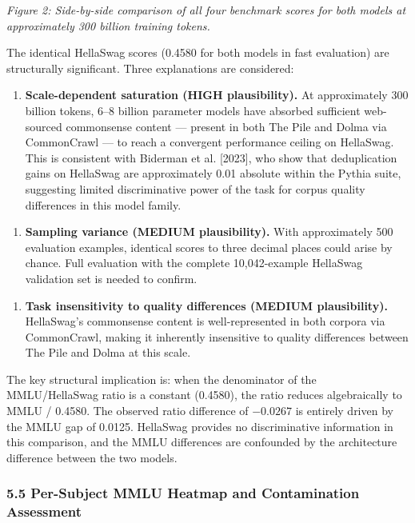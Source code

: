 \textit{Figure 2: Side-by-side comparison of all four benchmark scores for both models at approximately 300 billion training tokens.}

The identical HellaSwag scores (0.4580 for both models in fast evaluation) are structurally significant. Three explanations are considered:

\begin{enumerate}
\item \textbf{Scale-dependent saturation (HIGH plausibility).} At approximately 300 billion tokens, 6--8 billion parameter models have absorbed sufficient web-sourced commonsense content --- present in both The Pile and Dolma via CommonCrawl --- to reach a convergent performance ceiling on HellaSwag. This is consistent with Biderman et al. [2023], who show that deduplication gains on HellaSwag are approximately 0.01 absolute within the Pythia suite, suggesting limited discriminative power of the task for corpus quality differences in this model family.
\end{enumerate}

\begin{enumerate}
\item \textbf{Sampling variance (MEDIUM plausibility).} With approximately 500 evaluation examples, identical scores to three decimal places could arise by chance. Full evaluation with the complete 10,042-example HellaSwag validation set is needed to confirm.
\end{enumerate}

\begin{enumerate}
\item \textbf{Task insensitivity to quality differences (MEDIUM plausibility).} HellaSwag's commonsense content is well-represented in both corpora via CommonCrawl, making it inherently insensitive to quality differences between The Pile and Dolma at this scale.
\end{enumerate}

The key structural implication is: when the denominator of the MMLU/HellaSwag ratio is a constant (0.4580), the ratio reduces algebraically to MMLU / 0.4580. The observed ratio difference of $-0.0267$ is entirely driven by the MMLU gap of 0.0125. HellaSwag provides no discriminative information in this comparison, and the MMLU differences are confounded by the architecture difference between the two models.

\subsubsection{5.5 Per-Subject MMLU Heatmap and Contamination Assessment}

